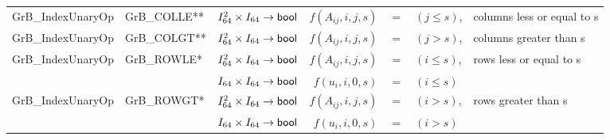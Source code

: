 \begin{landscape}
\begin{table}
\begin{threeparttable}
\begin{tabular}{l|l|l|rcll}
{\sf GrB\_IndexUnaryOp}   & {\sf GrB\_COLLE}**   & $I_{64}^2 \times I_{64} \rightarrow {\sf bool}$ & $f(A_{ij},i,j,s)$ & $=$ & $(j \leq s)$, & columns less or equal to s \\
{\sf GrB\_IndexUnaryOp}   & {\sf GrB\_COLGT}**   & $I_{64}^2 \times I_{64} \rightarrow {\sf bool}$ & $f(A_{ij},i,j,s)$ & $=$ & $(j >    s)$, & columns greater than s \\
{\sf GrB\_IndexUnaryOp}   & {\sf GrB\_ROWLE}*    & $I_{64}^2 \times I_{64} \rightarrow {\sf bool}$ & $f(A_{ij},i,j,s)$ & $=$ & $(i \leq s)$, & rows less or equal to s \\
                          &                      & $I_{64}   \times I_{64} \rightarrow {\sf bool}$ & $f(u_{i}, i,0,s)$ & $=$ & $(i \leq s)$  \\
{\sf GrB\_IndexUnaryOp}   & {\sf GrB\_ROWGT}*    & $I_{64}^2 \times I_{64} \rightarrow {\sf bool}$ & $f(A_{ij},i,j,s)$ & $=$ & $(i >    s)$, & rows greater than s \\
                          &                      & $I_{64}   \times I_{64} \rightarrow {\sf bool}$ & $f(u_{i}, i,0,s)$ & $=$ & $(i >    s)$ \\
\hline
                     

\end{tabular}
\end{threeparttable}
\end{table}
\end{landscape}
